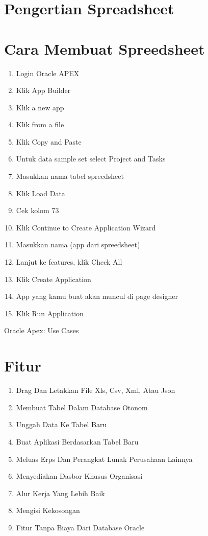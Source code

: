 \documentclass{article}
\begin{document}
\section{Pengertian Spreadsheet}
\usepackage {Spreadsheet: Memungkinkan Pengguna Untuk Menyimpan Berbagai Informasi Yang Sangat Lengkap, Pada Setiap Kolomnya Bisa Menyimpan Berbagai Data Informasi Yang Berbeda Dari Informasi Yang Di Perlukan.App From Spread- sheet Disini Berupa Beberapa Project Dan Nama Tugas Nya Serta Keterangan Lainnya Seperti Tanggal Mulai, Tanggal Selesai, Status, Di Ttd Oleh,Biaya, Budget Tersedia, Dan Lebih Kurangnya Dari Budget.}
\section{Cara Membuat Spreedsheet}
\begin{enumerate}
    \item Login Oracle APEX
    \item Klik App Builder
    \item Klik a new app
    \item Klik from a file
    \item Klik Copy and Paste
    \item Untuk data sample set select Project and Tasks
    \item Masukkan nama tabel spreedsheet
    \item Klik Load Data
    \item Cek kolom 73
    \item Klik Continue to Create Application Wizard 
    \item Masukkan nama (app dari spreedsheet)
    \item Lanjut ke features, klik Check All
    \item Klik Create Application
    \item App yang kamu buat akan muncul di page designer 
    \item Klik Run Application
\end{enumerate}

Oracle Apex: Use Cases
\section{Fitur}
\begin{enumerate}
    \item Drag Dan Letakkan File Xls, Csv, Xml, Atau Json
    \item Membuat Tabel Dalam Database Otonom
    \item Unggah Data Ke Tabel Baru
    \item Buat Aplikasi Berdasarkan Tabel Baru
    \item Meluas Erps Dan Perangkat Lunak Perusahaan Lainnya
    \item Menyediakan Dasbor Khusus Organisasi
    \item Alur Kerja Yang Lebih Baik
    \item Mengisi Kekosongan
    \item Fitur Tanpa Biaya Dari Database Oracle
\end{enumerate}
\end{document}
